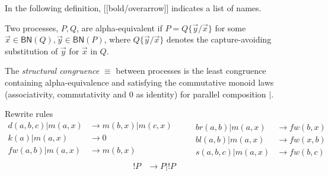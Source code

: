 \documentclass{llncs}
\newcommand{\pzero}{\mathbin{0}}
\newcommand{\scong}{\mathbin{\equiv}}
\newcommand{\boundnames}[1]{\mathbin{\mathsf{BN}(#1)}}
\newcommand{\red}{\rightarrow}
\begin{document}
In the following definition, [[bold/overarrow]] indicates a list of names.

\begin{definition}
Two processes, $P,Q$, are alpha-equivalent if $P = Q\{\vec{y}/\vec{x}\}$ for
some $\vec{x} \in \boundnames{Q},\vec{y} \in \boundnames{P}$, where $Q\{\vec{y}/\vec{x}\}$
denotes the capture-avoiding substitution of $\vec{y}$ for $\vec{x}$ in $Q$.
\end{definition}

\begin{definition}
  The {\em structural congruence} $\equiv$
  between processes \cite{SangiorgiWalker} is the least congruence containing
  alpha-equivalence and satisfying the commutative monoid laws
  (associativity, commutativity and $\pzero$ as identity) for parallel
  composition $|$.
\end{definition}

Rewrite rules
\[\begin{array}{rl}
  d(a,b,c) | m(a,x) & \red m(b,x) | m(c,x) \\
  k(a) | m(a,x) & \red 0 \\
  fw(a,b) | m(a,x) & \red m(b,x) \\
\end{array} \quad \quad
\begin{array}{rl}
  br(a,b) | m(a,x) & \red fw(b,x) \\
  bl(a,b) | m(a,x) & \red fw(x,b) \\
  s(a,b,c) | m(a,x) & \red fw(b,c)
\end{array}\]
\[\begin{array}{rl}
  !P & \red P|!P \\
\end{array}\]
\end{document}
